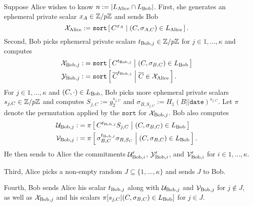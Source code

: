 \documentclass{article}
\begin{document}
Suppose Alice wishes to know $n := |L_{\textrm{Alice}} \cap L_{\textrm{Bob}}|$.
First, she generates an ephemeral private scalar $x_A \in
\mathbb{Z}/p\mathbb{Z}$ and sends Bob
\begin{equation}
{\cal X}_\Alice := \texttt{sort}
  \Listst{ C^{x_A} }{ (C, \sigma_{A,C}) \in L_\Alice }
  \mathperiod
\end{equation}
Second, Bob picks ephemeral private scalars
 $t_{{\textrm{Bob}},j} \in \mathbb{Z}/p\mathbb{Z}$ for $j \in 1,\ldots,\kappa$ and
 computes
\begin{align}
  {\cal X}_{\Bob,j} :&= \texttt{sort}
  \Listst{ C^{t_{\Bob,j}} }{ (C, \sigma_{B,C}) \in L_\Bob }  \\
  {\cal Y}_{\Bob,j} :&= \texttt{sort}
  \Listst{ \overline{C}^{t_{\Bob,j}}}{ \overline{C} \in {\cal X}_\Alice }
  \mathperiod
\end{align}
For $j \in 1,\ldots,\kappa$ and $(C,\cdot) \in L_{\textrm{Bob}}$,
Bob picks more ephemeral private scalars $s_{j,C} \in \mathbb{Z}/p\mathbb{Z}$ and
computes $S_{j,C} := g_2^{s_{j,C}}$ and
 $\sigma_{B,S_{j,C}} := H_1(B||\texttt{date})^{s_{j,C}}$.
Let $\pi$ denote the permutation applied by the $\texttt{sort}$ for ${\cal X}_{{\textrm{Bob}},j}$.
Bob also computes
\begin{align}
  {\cal U}_{\Bob,j} :&= \pi
  \Listst{ C^{t_{\Bob,j}} S_{j,C} }{ (C, \sigma_{B,C}) \in L_\Bob }  \\
  {\cal V}_{\Bob,j} :&= \pi
  \Listst{ \sigma_{B,C}^{t_{\Bob,j}} \sigma_{B,S_C} }{ (C, \sigma_{B,C}) \in L_\Bob }
  \mathperiod
\end{align}
He then sends to Alice the commitments
 ${\cal U}'_{{\textrm{Bob}},i}$, %
 ${\cal Y}'_{{\textrm{Bob}},i}$, and
 ${\cal V}'_{{\textrm{Bob}},i}$ for $i \in 1,\ldots,\kappa$.

Third, Alice picks a non-empty random $J \subseteq \{1,\ldots,\kappa\}$
 and sends $J$ to Bob.

Fourth, Bob sends
 Alice his scalar $t_{{\textrm{Bob}},j}$ along with
 ${\cal U}_{{\textrm{Bob}},j}$ and ${\cal V}_{{\textrm{Bob}},j}$ for $j \notin J$,
as well as
 ${\cal X}_{{\textrm{Bob}},j}$ and his scalars
 $\pi [ s_{j,C} | (C, \sigma_{B,C}) \in L_{\textrm{Bob}} ]$ for $j \in J$.
\end{document}
